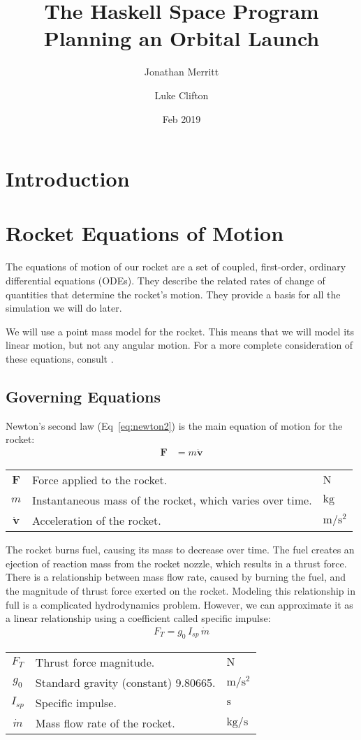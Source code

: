 \documentclass[12pt,openany]{book}
\title{
  The Haskell Space Program\\
  Planning an Orbital Launch
}
\author{
  Jonathan Merritt
  \and
  Luke Clifton
}
\date{Feb 2019}
\renewcommand{\vec}[1]{\ensuremath{\mathbf{#1}}}
\newcommand{\vecdot}[1]{\ensuremath{\dot{\mathbf{#1}}}}
\newenvironment{symbols}
{%
  \begin{flushright}%
  \begin{tcolorbox}[enhanced,width=0.9\textwidth,colback=black!8!white,frame hidden]%
  \begin{tabular}{cp{0.8\textwidth}l}%
}
{%
  \end{tabular}%
  \end{tcolorbox}%
  \end{flushright}%
}
\newcommand{\unitsforce}{$\mathrm{N}$}
\newcommand{\unitsmass}{$\mathrm{kg}$}
\newcommand{\unitsacceleration}{$\mathrm{m}/\mathrm{s}^2$}
\newcommand{\unitstime}{$\mathrm{s}$}
\newcommand{\unitsmassflowrate}{$\mathrm{kg}/\mathrm{s}$}
\begin{document}
\maketitle
\tableofcontents

\chapter{Introduction}

\chapter{Rocket Equations of Motion}

The equations of motion of our rocket are a set of coupled, first-order, ordinary differential equations (ODEs). They describe the related rates of change of quantities that determine the rocket's motion. They provide a basis for all the simulation we will do later.

We will use a point mass model for the rocket. This means that we will model its linear motion, but not any angular motion. For a more complete consideration of these equations, consult \cite{gantmacher1950}.

\section{Governing Equations}

Newton's second law (Eq~\ref{eq:newton2}) is the main equation of motion for the rocket:
\begin{align}
  \vec{F} &= m \vecdot{v}  \label{eq:newton2}
\end{align}
\begin{symbols}
  \vec{F} & Force applied to the rocket. & \unitsforce \\
  $m$ & Instantaneous mass of the rocket, which varies over time. & \unitsmass \\
  \vecdot{v} & Acceleration of the rocket. & \unitsacceleration
\end{symbols}
The rocket burns fuel, causing its mass to decrease over time. The fuel creates an ejection of reaction mass from the rocket nozzle, which results in a thrust force. There is a relationship between mass flow rate, caused by burning the fuel, and the magnitude of thrust force exerted on the rocket. Modeling this relationship in full is a complicated hydrodynamics problem. However, we can approximate it as a linear relationship using a coefficient called specific impulse:
\begin{align}
  F_T = g_0\,I_{sp}\,\dot{m}
\end{align}
\begin{symbols}
  $F_T$ & Thrust force magnitude. & \unitsforce \\
  $g_0$ & Standard gravity (constant) 9.80665. & \unitsacceleration \\
  $I_{sp}$ & Specific impulse. & \unitstime \\
  $\dot{m}$ & Mass flow rate of the rocket. & \unitsmassflowrate
\end{symbols}
\end{document}
